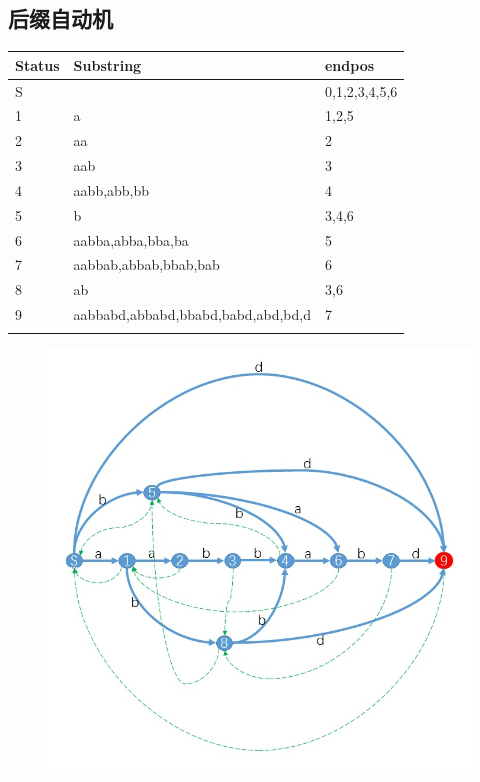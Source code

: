 \documentclass[UTF8,a4paper,titlepage]{ctexart}
\begin{document}
\subsection{后缀自动机}
\begin{tabularx}{10cm}{llX}  %
\hline 
Status & Substring  & endpos  \\  
\hline  
S  &  & {0,1,2,3,4,5,6} \\  
1 & a & {1,2,5} \\  
2 & aa & {2} \\
3 & aab & {3} \\
4 & aabb,abb,bb & {4}\\
5 & b & {3,4,6}\\
6 & aabba,abba,bba,ba & {5}\\
7 & aabbab,abbab,bbab,bab & {6}\\
8 & ab & {3,6}\\
9 & aabbabd,abbabd,bbabd,babd,abd,bd,d & {7}\\
\hline\label{key}
\end{tabularx}  
  
\begin{figure}[h!]
\centering
\includegraphics[scale=0.8]{sam.jpg}
\label{fig:sam}
\end{figure}
 
\end{document}
